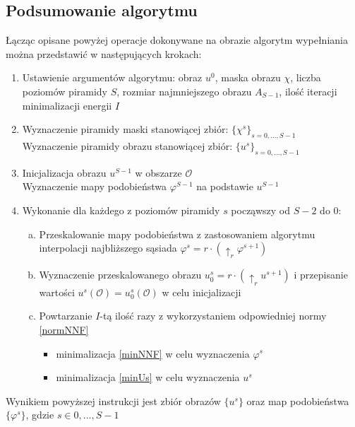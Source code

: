 \documentclass[12pt, twoside, openany]{report}
\theoremstyle{definition}
\begin{document}
\subsection{Podsumowanie algorytmu}
Łącząc opisane powyżej operacje dokonywane na obrazie algorytm wypełniania można przedstawić w następujących krokach:
\begin{enumerate}
\item
Ustawienie argumentów algorytmu: obraz $u^{0}$, maska obrazu $\chi$, liczba poziomów piramidy $S$, rozmiar najmniejszego obrazu $A_{S-1}$, ilość iteracji minimalizacji energii $I$
\item
Wyznaczenie piramidy maski stanowiącej zbiór: $\{\chi^s\}_{s=0,...,S-1}$ \\
Wyznaczenie piramidy obrazu stanowiącej zbiór: $\{u^s\}_{s=0,...,S-1}$
\item
Inicjalizacja obrazu $u^{S-1}$ w obszarze $\mathcal{O}$ \\
Wyznaczenie mapy podobieństwa $\varphi^{S-1}$ na podstawie $u^{S-1}$
\item
Wykonanie dla każdego z poziomów piramidy $s$ począwszy od $S-2$ do $0$:
\begin{enumerate}[a)]
\item
Przeskalowanie mapy podobieństwa z zastosowaniem algorytmu interpolacji najbliższego sąsiada $\varphi^s=r \cdot (\uparrow_r \varphi^{s+1})$
\item
Wyznaczenie przeskalowanego obrazu $u^s_0=r \cdot (\uparrow_r u^{s+1})$ i przepisanie wartości $u^s(\mathcal{O})=u^s_0(\mathcal{O})$ w celu inicjalizacji
\item
Powtarzanie $I$-tą ilość razy z wykorzystaniem odpowiedniej normy \eqref{normNNF}
\begin{itemize}
\item
minimalizacja \eqref{minNNF} w celu wyznaczenia $\varphi^s$
\item
minimalizacja \eqref{minUs} w celu wyznaczenia $u^s$
\end{itemize}  
\end{enumerate}
\end{enumerate}
Wynikiem powyższej instrukcji jest zbiór obrazów $\{u^s\}$ oraz map podobieństwa $\{\varphi^s\}$, gdzie $s \in {0,...,S-1}$
\end{document}
